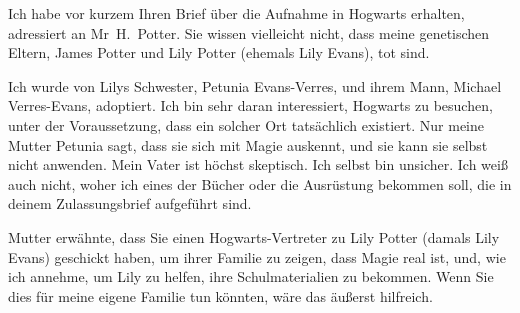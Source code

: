 \begin{writtenNote}


Ich habe vor kurzem Ihren Brief über die Aufnahme in Hogwarts erhalten, adressiert an Mr~H.~Potter. Sie wissen vielleicht nicht, dass meine genetischen Eltern, James Potter und Lily Potter (ehemals Lily Evans), tot sind.

Ich wurde von Lilys Schwester, Petunia Evans-Verres, und ihrem Mann, Michael Verres-Evans, adoptiert. Ich bin sehr daran interessiert, Hogwarts zu besuchen, unter der Voraussetzung, dass ein solcher Ort tatsächlich existiert. Nur meine Mutter Petunia sagt, dass sie sich mit Magie auskennt, und sie kann sie selbst nicht anwenden. Mein Vater ist höchst skeptisch. Ich selbst bin unsicher. Ich weiß auch nicht, woher ich eines der Bücher oder die Ausrüstung bekommen soll, die in deinem Zulassungsbrief aufgeführt sind.

Mutter erwähnte, dass Sie einen Hogwarts-Vertreter zu Lily Potter (damals Lily Evans) geschickt haben, um ihrer Familie zu zeigen, dass Magie real ist, und, wie ich annehme, um Lily zu helfen, ihre Schulmaterialien zu bekommen. Wenn Sie dies für meine eigene Familie tun könnten, wäre das äußerst hilfreich.

\end{writtenNote}

